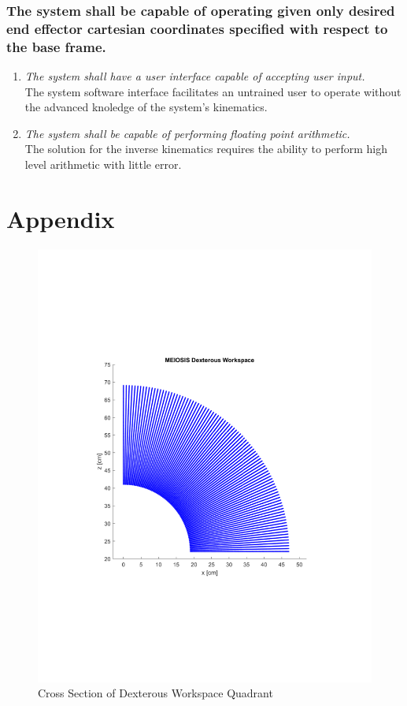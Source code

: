 \documentclass[12pt]{report}
\renewcommand\thesection{\arabic{section}}
\begin{document}
\subsubsection{The system shall be capable of operating given only desired end effector cartesian coordinates specified with respect to the base frame.}
\begin{enumerate}[label=\thesubsubsection.\alph*,leftmargin=3cm,font=\itshape]
  \item \textit{The system shall have a user interface capable of accepting user input.}  \\
    The system software interface facilitates an untrained user to operate without the advanced knoledge of the system's kinematics.
  \item \textit{The system shall be capable of performing floating point arithmetic.} \\
  The solution for the inverse kinematics requires the ability to perform high level arithmetic with little error.
\end{enumerate}

\newpage
\appendix
\renewcommand\thesection{\Roman{section}}
\renewcommand\thesubsection{\roman{subsection}}
\section*{Appendix}\label{sec:app}
\begin{figure}[htp]
  \centering
  \includegraphics[frame,width=.75\textwidth]{dex}
  \caption{Cross Section of Dexterous Workspace Quadrant}
  \label{fig:dex}
\end{figure}

\newpage


\end{document}
